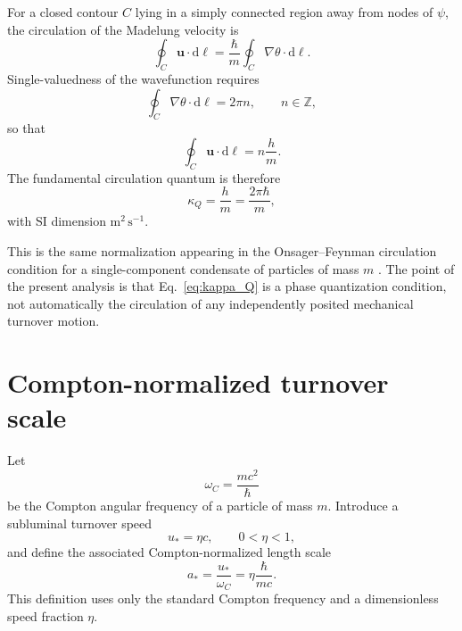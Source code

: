 \documentclass[11pt,a4paper]{article}
\newcommand{\dd}{\mathrm{d}}
\newcommand{\kappaQ}{\kappa_{Q}}
\newcommand{\omegaC}{\omega_{C}}
\newcommand{\uStar}{u_{*}}
\newcommand{\aStar}{a_{*}}
\begin{document}
For a closed contour $C$ lying in a simply connected region away from nodes of $\psi$, the circulation of the Madelung velocity is
\begin{equation}
    \oint_C\mathbf{u}\cdot\dd\boldsymbol{\ell}
    =
    \frac{\hbar}{m}\oint_C\nabla\theta\cdot\dd\boldsymbol{\ell}.
\end{equation}
Single-valuedness of the wavefunction requires
\begin{equation}
    \oint_C\nabla\theta\cdot\dd\boldsymbol{\ell}=2\pi n,
    \qquad n\in\mathbb{Z},
\end{equation}
so that
\begin{equation}
    \oint_C\mathbf{u}\cdot\dd\boldsymbol{\ell}
    =
    n\frac{h}{m}.
\end{equation}
The fundamental circulation quantum is therefore
\begin{equation}
    \kappaQ=\frac{h}{m}=\frac{2\pi\hbar}{m},
    \label{eq:kappa_Q}
\end{equation}
with SI dimension $\mathrm{m^2\,s^{-1}}$.

This is the same normalization appearing in the Onsager--Feynman circulation condition for a single-component condensate of particles of mass $m$ \cite{Onsager1949,Feynman1955,Donnelly1991}. The point of the present analysis is that Eq.~\eqref{eq:kappa_Q} is a phase quantization condition, not automatically the circulation of any independently posited mechanical turnover motion.

\section{Compton-normalized turnover scale}

Let
\begin{equation}
    \omegaC=\frac{mc^2}{\hbar}
    \label{eq:omega_C}
\end{equation}
be the Compton angular frequency of a particle of mass $m$. Introduce a subluminal turnover speed
\begin{equation}
    \uStar=\eta c,
    \qquad 0<\eta<1,
    \label{eq:u_star}
\end{equation}
and define the associated Compton-normalized length scale
\begin{equation}
    \aStar=\frac{\uStar}{\omegaC}
    =
    \eta\frac{\hbar}{mc}.
    \label{eq:a_star}
\end{equation}
This definition uses only the standard Compton frequency and a dimensionless speed fraction $\eta$.
\end{document}
